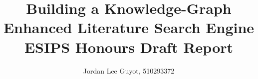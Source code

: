 \documentclass[journal, 9pt]{IEEEtran}
\begin{document}

\title{Building a Knowledge-Graph Enhanced Literature Search Engine\\ \small{ESIPS Honours Draft Report}}

\author{Jordan Lee Guyot, 510293372}%
        
{}

\maketitle

















\newpage

\onecolumn




\makeatletter
\setcounter{section}{0}
\renewcommand\thesection{\@Alph\c@section}
\let\section\appendix@section
\makeatother
\end{document}
